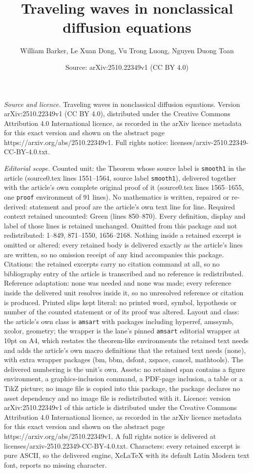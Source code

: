 \documentclass[10pt,a4paper]{amsart}
\title[Traveling waves in nonclassical diffusion equations]{Traveling waves in nonclassical diffusion equations}
\author{William Barker, Le Xuan Dong, Vu Trong Luong, Nguyen Duong Toan}
\date{Source: arXiv:2510.22349v1 (CC BY 4.0)}
\begin{document}
\maketitle

\noindent\emph{Source and licence.} Traveling waves in nonclassical diffusion equations. Version arXiv:2510.22349v1 (CC BY 4.0), distributed under the Creative Commons Attribution 4.0 International licence, as recorded in the arXiv licence metadata for this exact version and shown on the abstract page https://arxiv.org/abs/2510.22349v1. Full rights notice: licenses/arxiv-2510.22349-CC-BY-4.0.txt.\par\smallskip

\noindent\textit{Editorial scope.} Counted unit: the Theorem whose source label is \texttt{smooth1} in the article (source0.tex lines 1551--1564, source label \texttt{smooth1}), delivered together with the article's own complete original proof of it (source0.tex lines 1565--1655, one \texttt{proof} environment of 91 lines). No mathematics is written, repaired or re-derived: statement and proof are the article's own text line for line. Required context retained uncounted: Green (lines 850--870). Every definition, display and label of those lines is retained unchanged. Omitted from this package and not redistributed: 1--849, 871--1550, 1656--2168. Nothing inside a retained excerpt is omitted or altered: every retained body is delivered exactly as the article's lines are written, so no omission receipt of any kind accompanies this package. Citations: the retained excerpts carry no citation command at all, so no bibliography entry of the article is transcribed and no reference is redistributed. Reference adaptation: none was needed and none was made; every reference inside the delivered unit resolves inside it, so no unresolved reference or citation is produced. Printed slips kept literal: no printed word, symbol, hypothesis or number of the counted statement or of its proof was altered. Layout and class: the article's own class is \texttt{amsart} with packages including hyperref, amssymb, xcolor, geometry; the wrapper is the lane's pinned \texttt{amsart} editorial wrapper at 10pt on A4, which restates the theorem-like environments the retained text needs and adds the article's own macro definitions that the retained text needs (none), with extra wrapper packages (bm, bbm, dsfont, xspace, cancel, mathtools). The delivered numbering is the unit's own. Assets: no retained span contains a figure environment, a graphics-inclusion command, a PDF-page inclusion, a table or a TikZ picture; no image file is copied into this package, the package declares no asset dependency and no image file is redistributed with it. Licence: version arXiv:2510.22349v1 of this article is distributed under the Creative Commons Attribution 4.0 International licence, as recorded in the arXiv licence metadata for this exact version and shown on the abstract page https://arxiv.org/abs/2510.22349v1. A full rights notice is delivered at licenses/arxiv-2510.22349-CC-BY-4.0.txt. Characters: every retained excerpt is pure ASCII, so the delivered engine, XeLaTeX with its default Latin Modern text font, reports no missing character.
\end{document}
